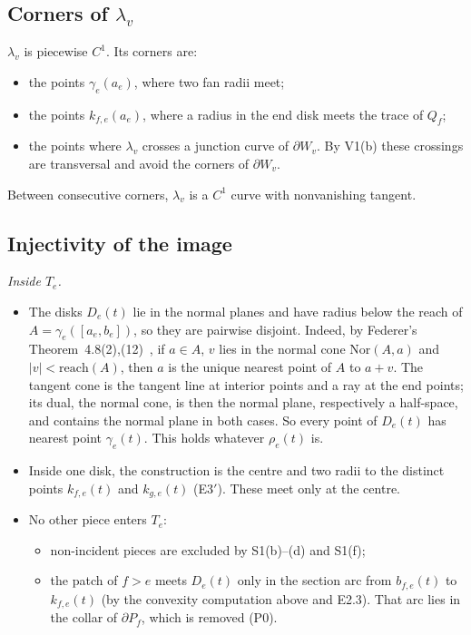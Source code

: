 \subsection{Corners of $\lambda_v$}
$\lambda_v$ is piecewise $C^1$. Its corners are:
\begin{itemize}
\item the points $\gamma_e(a_e)$, where two fan radii meet;
\item the points $k_{f,e}(a_e)$, where a radius in the end disk meets the trace of $Q_f$;
\item the points where $\lambda_v$ crosses a junction curve of $\partial W_v$. By V1(b) these crossings are
transversal and avoid the corners of $\partial W_v$.
\end{itemize}
Between consecutive corners, $\lambda_v$ is a $C^1$ curve with nonvanishing tangent.

\subsection{Injectivity of the image}
\emph{Inside $T_e$.}
\begin{itemize}
\item The disks $D_e(t)$ lie in the normal planes and have radius below the reach of $A=\gamma_e([a_e,b_e])$, so they
are pairwise disjoint. Indeed, by Federer's Theorem~4.8(2),(12)~\cite[pp.~434--435]{Federer59}, if $a\in A$, $v$ lies
in the normal cone $\mathrm{Nor}(A,a)$ and $|v|<\mathrm{reach}(A)$, then $a$ is the unique nearest point of $A$ to $a+v$.
The tangent cone is the tangent line at interior points and a ray at the end points; its dual, the normal cone, is
then the normal plane, respectively a half-space, and contains the normal plane in both cases. So every point of $D_e(t)$ has nearest point $\gamma_e(t)$. This holds
whatever $\rho_e(t)$ is.
\item Inside one disk, the construction is the centre and two radii to the distinct points $k_{f,e}(t)$ and
$k_{g,e}(t)$ (E3$'$). These meet only at the centre.
\item No other piece enters $T_e$:
  \begin{itemize}
  \item non-incident pieces are excluded by S1(b)--(d) and S1(f);
  \item the patch of $f>e$ meets $D_e(t)$ only in the section arc from $b_{f,e}(t)$ to $k_{f,e}(t)$ (by the convexity
  computation above and E2.3). That arc lies in the collar of $\partial P_f$, which is removed (P0).
  \end{itemize}
\end{itemize}

